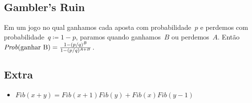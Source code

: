 \subsection{Gambler's Ruin}
Em um jogo no qual ganhamos cada aposta com probabilidade~$p$ e perdemos com probabilidade~$q \coloneqq 1 - p$, paramos quando ganhamos~$B$ ou perdemos~$A$. Então~$\mathit{Prob}(\textnormal{ganhar B}) = \frac{1 - (p/q)^B}{1 - (p/q)^{A+B}}$.

\subsection{Extra}
\newcommand{\Fib}{\mathit{Fib}}
\begin{itemize}
\item $\Fib(x + y) = \Fib(x + 1) \Fib(y) + \Fib(x) \Fib(y - 1)$
\end{itemize}
